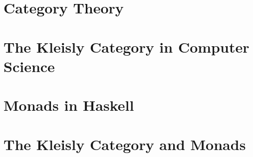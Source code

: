 \documentclass[a4paper]{article}
\begin{document}
\section{Category Theory}

\section{The Kleisly Category in Computer Science}

\section{Monads in Haskell}

\section{The Kleisly Category and Monads}
\end{document}
